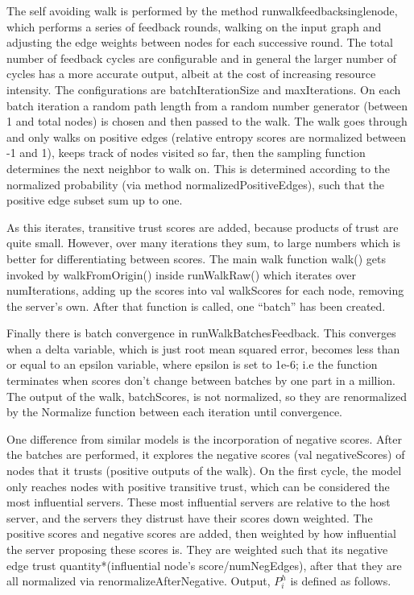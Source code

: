 \documentclass{article}
\begin{document}
The self avoiding walk is performed by the method runwalkfeedbacksinglenode, which performs a series of feedback rounds, walking on the input graph and adjusting the edge weights between nodes for each successive round. The total number of feedback cycles are configurable and in general the larger number of cycles has a more accurate output, albeit at the cost of increasing resource intensity. The configurations are batchIterationSize and maxIterations. On each batch iteration a random path length from a random number generator (between 1 and total nodes) is chosen and then passed to the walk. The walk goes through and only walks on positive edges (relative entropy scores are normalized between -1 and 1), keeps track of nodes visited so far, then the sampling function determines the next neighbor to walk on. This is determined according to the normalized probability (via method normalizedPositiveEdges), such that the positive edge subset sum up to one.

As this iterates, transitive trust scores are added, because products of trust are quite small. However, over many iterations they sum, to large numbers which is better for differentiating between scores. The main walk function walk() gets invoked by walkFromOrigin() inside runWalkRaw() which iterates over numIterations, adding up the scores into val walkScores for each node, removing the server’s own. After that function is called, one “batch” has been created. 

Finally there is batch convergence in runWalkBatchesFeedback. This converges when a delta variable, which is just root mean squared error, becomes less than or equal to an epsilon variable, where epsilon is set to 1e-6; i.e the function terminates when scores don’t change between batches by one part in a million. The output of the walk, batchScores, is not normalized, so they are renormalized by the Normalize function between each iteration until convergence.

One difference from similar models is the incorporation of negative scores. After the batches are performed, it explores the negative scores (val negativeScores) of nodes that it trusts (positive outputs of the walk). On the first cycle, the model only reaches nodes with positive transitive trust, which can be considered the most influential servers. These most influential servers are relative to the host server, and the servers they distrust have their scores down weighted. The positive scores and negative scores are added, then weighted by how influential the server proposing these scores is. They are weighted such that its negative edge trust quantity*(influential node’s score/numNegEdges), after that they are all normalized via renormalizeAfterNegative. Output, $P_i^h$ is defined as follows.
\end{document}
